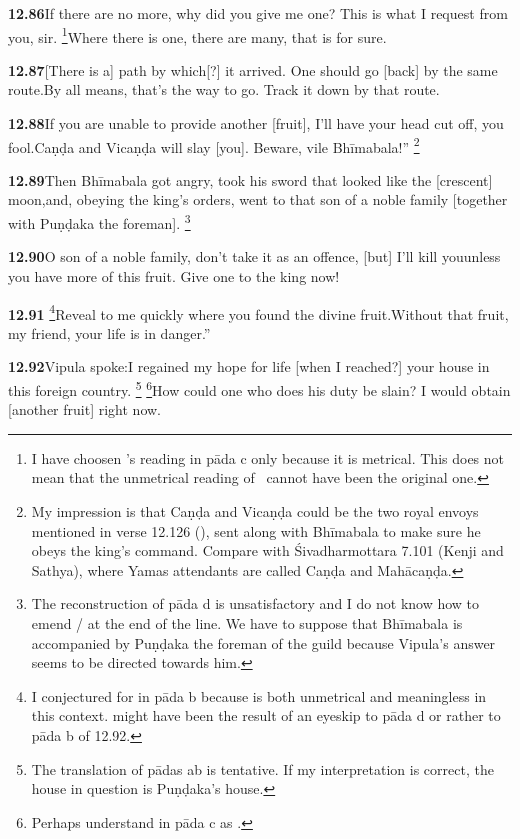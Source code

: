 \textbf{12.86}If there are no more, why did you give me one? This is what I request from you, sir.%
\footnote{I have choosen \msCb's reading in pāda c only because it is metrical. This                 does not mean that the unmetrical reading of \msCa\msNa\msNc\ cannot have                  been the original one.  }Where there is one, there are many, that is for sure.%


\textbf{12.87}[There is a] path by which[?] it arrived. One should go [back] by the same route.By all means, that's the way to go. Track it down by that route.%


\textbf{12.88}If you are unable to provide another [fruit], I'll have your head cut off, you fool.Caṇḍa and Vicaṇḍa will slay [you]. Beware, vile Bhīmabala!''%
\footnote{My impression is that Caṇḍa and Vicaṇḍa could be the two royal envoys mentioned                in verse 12.126 (), sent along with Bhīmabala to make sure he obeys the king's command.               Compare with Śivadharmottara 7.101 (Kenji and Sathya), where Yamas attendants are               called Caṇḍa and Mahācaṇḍa.  }%


\textbf{12.89}Then Bhīmabala got angry, took his sword that looked like the [crescent] moon,and, obeying the king's orders, went to that son of a noble family                [together with Puṇḍaka the foreman].%
\footnote{The reconstruction of pāda d is unsatisfactory and I do not know               how to emend / at the end of the line. We have to suppose               that Bhīmabala is accompanied by Puṇḍaka the foreman of the guild because               Vipula's answer seems to be directed towards him.  }%


\textbf{12.90}O son of a noble family, don't take it as an offence, [but] I'll kill youunless you have more of this fruit. Give one to the king now!%


\textbf{12.91}%
\footnote{I conjectured  for  in pāda b because  is both               unmetrical and meaningless in this context.  might have               been the result of an eyeskip to pāda d or rather to pāda b of 12.92.  }Reveal to me quickly where you found the divine fruit.Without that fruit, my friend, your life is in danger.''%


\textbf{12.92}Vipula spoke:I regained my hope for life [when I reached?] your house in this foreign country.%
\footnote{The translation of pādas ab is tentative. If my interpretation is                correct, the house in question is Puṇḍaka's house.  }%
\footnote{Perhaps understand  in pāda c as .  }How could one who does his duty be slain? I would obtain [another fruit] right now.%


